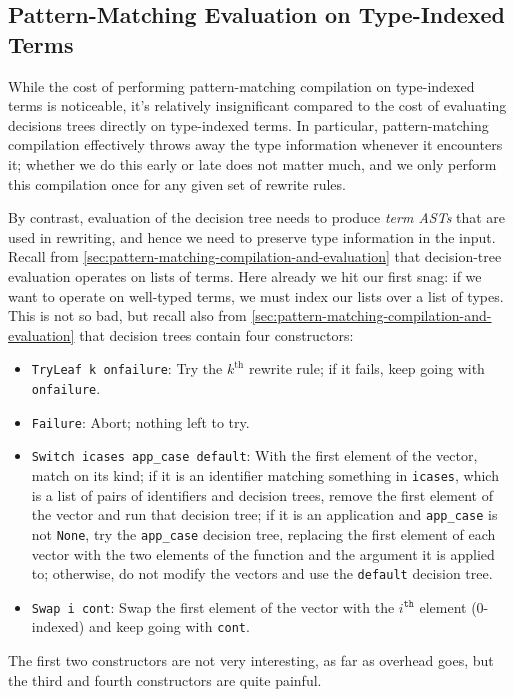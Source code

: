 \subsection{Pattern-Matching Evaluation on Type-Indexed Terms}\label{sec:rewriting-more:AST:type-indexed-pattern-matching}
While the cost of performing pattern-matching compilation on type-indexed terms is noticeable, it's relatively insignificant compared to the cost of evaluating decisions trees directly on type-indexed terms.
In particular, pattern-matching compilation effectively throws away the type information whenever it encounters it; whether we do this early or late does not matter much, and we only perform this compilation once for any given set of rewrite rules.

By contrast, evaluation of the decision tree needs to produce \emph{term ASTs} that are used in rewriting, and hence we need to preserve type information in the input.
Recall from \autoref{sec:pattern-matching-compilation-and-evaluation} that decision-tree evaluation operates on lists of terms.
Here already we hit our first snag: if we want to operate on well-typed terms, we must index our lists over a list of types.
This is not so bad, but recall also from \autoref{sec:pattern-matching-compilation-and-evaluation} that decision trees contain four constructors:
\begin{itemize}
  \item \texttt{TryLeaf k onfailure}: Try the $k^\text{th}$ rewrite rule; if it fails, keep going with \texttt{onfailure}.
  \item \texttt{Failure}: Abort; nothing left to try.
  \item \texttt{Switch icases app\_case default}:
    With the first element of the vector, match on its kind; if it is an identifier matching something in \texttt{icases}, which is a list of pairs of identifiers and decision trees, remove the first element of the vector and run that decision tree; if it is an application and \texttt{app\_case} is not \texttt{None}, try the \texttt{app\_case} decision tree, replacing the first element of each vector with the two elements of the function and the argument it is applied to; otherwise, do not modify the vectors and use the \texttt{default} decision tree.
  \item \texttt{Swap i cont}: Swap the first element of the vector with the $i^\texttt{th}$ element (0-indexed) and keep going with \texttt{cont}.
\end{itemize}
The first two constructors are not very interesting, as far as overhead goes, but the third and fourth constructors are quite painful.

